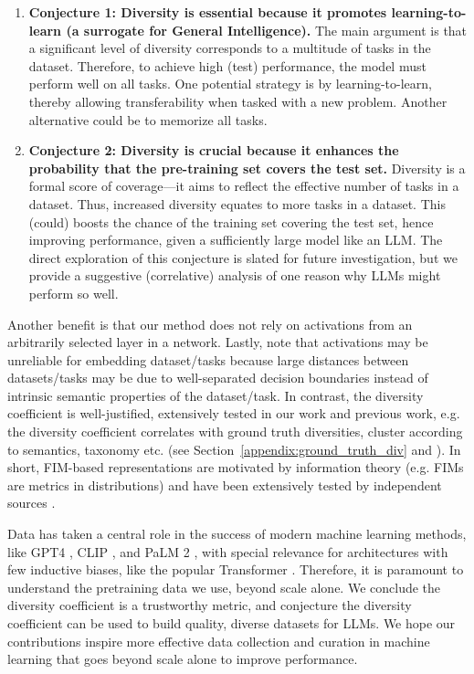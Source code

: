 \begin{enumerate}
    \item \textbf{Conjecture 1: Diversity is essential because it promotes learning-to-learn (a surrogate for General Intelligence).} 
    The main argument is that a significant level of diversity corresponds to a multitude of tasks in the dataset.
    Therefore, to achieve high (test) performance, the model must perform well on all tasks.
    One potential strategy is by learning-to-learn, thereby allowing transferability when tasked with a new problem. 
    Another alternative could be to memorize all tasks. 
    \item \textbf{Conjecture 2: Diversity is crucial because it enhances the probability that the pre-training set covers the test set.}
    Diversity is a formal score of coverage---it aims to reflect the effective number of tasks in a dataset.
    Thus, increased diversity equates to more tasks in a dataset.
    This (could) boosts the chance of the training set covering the test set, hence improving performance, given a sufficiently large model like an LLM.
    The direct exploration of this conjecture is slated for future investigation, but we provide a suggestive (correlative) analysis of one reason why LLMs might perform so well. 
\end{enumerate}

Another benefit is that our method does not rely on activations from an arbitrarily selected layer in a network.
Lastly, note that activations may be unreliable for embedding dataset/tasks because large distances between datasets/tasks may be due to well-separated decision boundaries instead of intrinsic semantic properties of the dataset/task.
In contrast, the diversity coefficient is well-justified, extensively tested in our work and previous work, e.g. the diversity coefficient correlates with ground truth diversities, cluster according to semantics, taxonomy etc. (see Section~\ref{appendix:ground_truth_div} and \citep{task2vec, curse_low_div}). 
In short, FIM-based representations are motivated by information theory (e.g. FIMs are metrics in distributions) and have been extensively tested by independent sources \citep{curse_low_div, task2vec, nlp_task2vec}.

Data has taken a central role in the success of modern machine learning methods, like GPT4 \citep{gpt4}, CLIP \citep{clip}, and PaLM 2 \citep{google2023palm2}, with special relevance for architectures with few inductive biases, like the popular Transformer \citep{vaswani2017attention}.
Therefore, it is paramount to understand the pretraining data we use, beyond scale alone.
We conclude the diversity coefficient is a trustworthy metric, and conjecture the diversity coefficient can be used to build quality, diverse datasets for LLMs.
We hope our contributions inspire more effective data collection and curation in machine learning that goes beyond scale alone to improve performance. 


